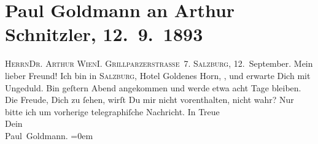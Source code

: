 

         \renewcommand{\erwaehnteOrte}{Orte: Getreidegasse, Grillparzerstraße, Hotel Goldenes Horn, Salzburg, Wien}
         \renewcommand{\erwaehnteWerke}{}
               \section[Paul Goldmann an Arthur Schnitzler, 12. 9. 1893]{ Paul Goldmann an Arthur Schnitzler, 12. 9. 1893}\nopagebreak{}\rehead{ }\begin{ledgroupsized}[t]{13cm}\normalsize\beginnumbering \toendnotes[C]{\smallbreak\pagebreak[2]} 
\toendnotes[C]{\smallbreak}\pstart{}{\pb}\textsc{Herrn}\pend{}\pstart{}\textsc{Dr. Arthur \label{T_L02715-1v}\label{T_L02715-1h}}\pend{}\pstart{}\textsc{Wien}\pend{}\pstart{}\textsc{I. Grillparzerstraſse 7}.\pend{}{\bigskip}\pstart
           \noindent{}\raggedleft{}{\pb}\textsc{Salzburg}, 12. September. \pend
           \pstart\center{}Mein lieber Freund!\pend\pstart
           Ich bin in \textsc{Salzburg}, Hotel Goldenes Horn, \label{K_L02715-2v}\label{K_L02715-2h}, und erwarte Dich mit Ungeduld. Bin geſtern{ }Abend angekommen und werde etwa acht Tage bleiben. Die Freude, Dich zu
               ſehen, wirſt Du mir nicht vorenthalten, nicht wahr? Nur bitte ich um vorherige
               telegraphiſche Nachricht.\pend
           \pstart
           In Treue{\\[\baselineskip]}Dein {\\[\baselineskip]}\spacefill\mbox{Paul Goldmann.}\pend
           \leftskip=0em{}
         
         \endnumbering{}\end{ledgroupsized}  \newcommand{\dateiname}{L02715}\newcommand{\titel}{Paul Goldmann an Arthur Schnitzler, 12. 9. 1893}\newcommand{\editorInnen}{Martin Anton Müller und Laura Untner}
      